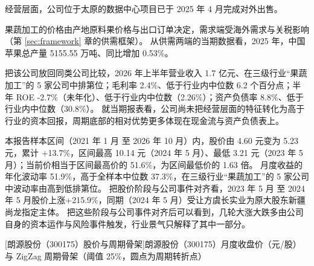  经营层面，公司位于太原的数据中心项目已于 2025 年 4 月完成对外出售。

 果蔬加工的价格由产地原料果价格与出口订单决定，需求端受海外需求与关税影响（第 \ref{sec:framework} 章的供需框架）。 从供需两端的当期数据看，2025 年，中国苹果总产量 5155.55 万吨、同比增加 0.53\%。

 把该公司放回同类公司比较，2026 年上半年营业收入 1.7 亿元、在三级行业“果蔬加工”的 5 家公司中排第位；毛利率 2.4\%、低于行业内中位数 6.2 个百分点；半年 ROE -2.7\%（未年化）、低于行业内中位数（2.26\%）；资产负债率 8.8\%、低于行业内中位数（30.8\%）。 就当期报表看，公司尚未把经营层面的特征转化为高于行业的资本回报，周期底部的相对优势更多体现在现金流与资产负债表上。

 本报告样本区间（2021 年 1 月 至 2026 年 10 月）内，股价由 4.60 元变为 5.23 元，累计 +13.7\%，区间最高 10.14 元（2024 年 5 月）、最低 3.21 元（2023 年 5 月）；当前价相当于区间最高价的 51.6\%，为区间最低价的 1.63 倍。 月度收益的年化波动率 51.9\%，高于全样本中位数 37.3\%，在三级行业“果蔬加工”的 5 家公司中波动率由高到低排第位。 把股价阶段与公司事件对齐看，2023 年 5 月 至 2024 年 5 月股价上涨+215.9\%，同期（2024 年 5 月）受让方虞长实业为原大股东新疆尚龙指定主体。 把这些阶段与公司事件对齐后可以看到，几轮大涨大跌多由公司自身的资本运作与风险事件触发，行业景气只解释了其中一部分。

\begin{center}
\begin{minipage}{\textwidth}\centering
{}

[朗源股份（300175）股价与周期骨架]{朗源股份（300175）月度收盘价（元/股）与 ZigZag 周期骨架（阈值 25\%，圆点为周期转折点）}
\end{minipage}
\end{center}

